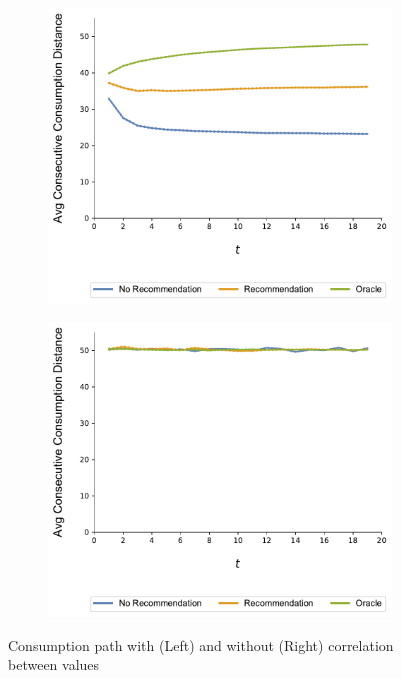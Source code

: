 \documentclass[format=acmsmall, review=false]{acmart}
\begin{document}
\begin{figure}
\begin{subfigure}{.5\linewidth}
  \centering
  \includegraphics[width=.9\linewidth]{figures/rho_pos_consumption_dist_N_200T_20_overall.pdf}
  \label{fig:sfig1}
\end{subfigure}%
\begin{subfigure}{.5\linewidth}
  \centering
  \includegraphics[width=.9\linewidth]{figures/rho_zero_consumption_dist_N_200T_20_overall.pdf}
  \label{fig:sfig2}
\end{subfigure}
\caption{Consumption path with (Left) and without (Right) correlation between values}
\label{fig:correlation_consumption_path}
\end{figure}
\end{document}
